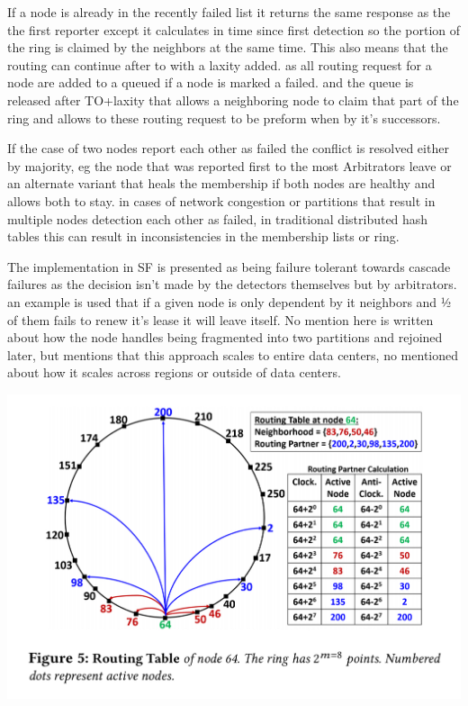 \documentclass[a4paper,10pt,titlepage]{report}
\begin{document}
If a node is already in the recently failed list it returns the same response as the the first reporter except it calculates in time since first detection so the portion of the ring is claimed by the neighbors at the same time. This also means that the routing can continue after to with a laxity added. as all routing request for a node are added to a queued if a node is marked a failed. and the queue is released after TO+laxity that allows a neighboring node to claim that part of the ring and allows to these routing request to be preform when by it's successors.\\
\vspace{5mm}

If the case of two nodes report each other as failed the conflict is resolved either by majority, eg the node that was reported first to the most Arbitrators leave or an alternate variant that heals the membership if both nodes are healthy and allows both to stay. in cases of network congestion or partitions that result in multiple nodes detection each other as failed, in traditional distributed hash tables this can result in inconsistencies in the membership lists or ring. \\
\vspace{5mm}

The implementation in SF is presented as being failure tolerant towards cascade failures as the decision isn't made by the detectors themselves but by arbitrators. an example is used that if a given node is only dependent by it neighbors and ½ of them fails to renew it's lease it will leave itself. No mention here is written about how the node handles being fragmented into two partitions and rejoined later, but mentions that this approach scales to entire data centers, no mentioned about how it scales across regions or outside of data centers.\\
\vspace{5mm}

\includegraphics[scale=0.3]{images/servicefabric-fig-ring-topology.jpeg}
\end{document}
